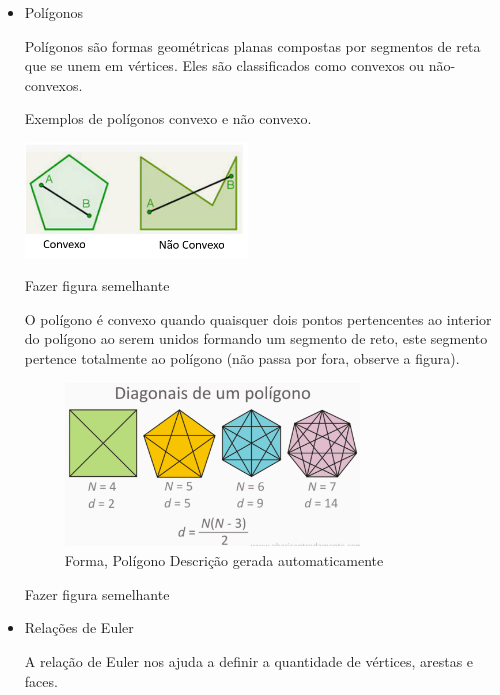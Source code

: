 \begin{escolha}
{{{\begin{escolha}
{{\begin{itemize}
Montar nova figura

O plano cartesiano tem os pontos indicado par ordenado (a, b). O valor
\textbf{a} é a abscissa e \textbf{b} é a ordenada. Por exemplo, o ponto
A é (2, \num{3}.

  \item Polígonos

Polígonos são formas geométricas planas compostas por segmentos de reta
que se unem em vértices. Eles são classificados como convexos ou
não-convexos.

Exemplos de polígonos convexo e não convexo.

\includegraphics[width=2.32292in,height=1.19387in]{./_SAEB_9_MAT/media/image160.png}

Fazer figura semelhante

O polígono é convexo quando quaisquer dois pontos pertencentes ao
interior do polígono ao serem unidos formando um segmento de reto, este
segmento pertence totalmente ao polígono (não passa por fora, observe a
figura).

\begin{figure}
\centering
\includegraphics[width=3.07204in,height=1.70833in]{./_SAEB_9_MAT/media/image161.png}
\caption{Forma, Polígono Descrição gerada automaticamente}
\end{figure}

Fazer figura semelhante

  \item Relações de Euler

A relação de Euler nos ajuda a definir a quantidade de vértices, arestas
e faces.


\end{itemize}}}
\end{escolha}}}}
\end{escolha}
